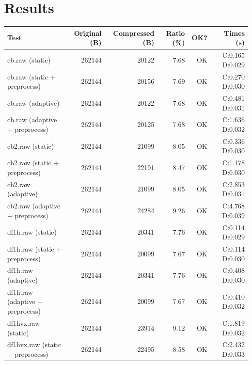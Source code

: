 \documentclass[a4paper,12pt]{article}
\begin{document}
    \section{Results}
    {
        \scriptsize
        \begin{tabular}{lrrrrr}
            \hline
            Test                               & Original (B) & Compressed (B) & Ratio (\%) & OK? & Times (s)        \\
            \hline
            cb.raw (static)                    & 262144       & 20122          & 7.68       & OK  & C:0.165 D:0.029  \\
            cb.raw (static + preprocess)       & 262144       & 20156          & 7.69       & OK  & C:0.270 D:0.030  \\
            cb.raw (adaptive)                  & 262144       & 20122          & 7.68       & OK  & C:0.481 D:0.031  \\
            cb.raw (adaptive + preprocess)     & 262144       & 20125          & 7.68       & OK  & C:1.636 D:0.032  \\
            cb2.raw (static)                   & 262144       & 21099          & 8.05       & OK  & C:0.336 D:0.030  \\
            cb2.raw (static + preprocess)      & 262144       & 22191          & 8.47       & OK  & C:1.178 D:0.030  \\
            cb2.raw (adaptive)                 & 262144       & 21099          & 8.05       & OK  & C:2.853 D:0.031  \\
            cb2.raw (adaptive + preprocess)    & 262144       & 24284          & 9.26       & OK  & C:4.768 D:0.039  \\
            df1h.raw (static)                  & 262144       & 20341          & 7.76       & OK  & C:0.114 D:0.029  \\
            df1h.raw (static + preprocess)     & 262144       & 20099          & 7.67       & OK  & C:0.114 D:0.030  \\
            df1h.raw (adaptive)                & 262144       & 20341          & 7.76       & OK  & C:0.408 D:0.030  \\
            df1h.raw (adaptive + preprocess)   & 262144       & 20099          & 7.67       & OK  & C:0.410 D:0.032  \\
            df1hvx.raw (static)                & 262144       & 23914          & 9.12       & OK  & C:1.819 D:0.032  \\
            df1hvx.raw (static + preprocess)   & 262144       & 22495          & 8.58       & OK  & C:2.432 D:0.033  \\

\end{tabular}}
\end{document}
